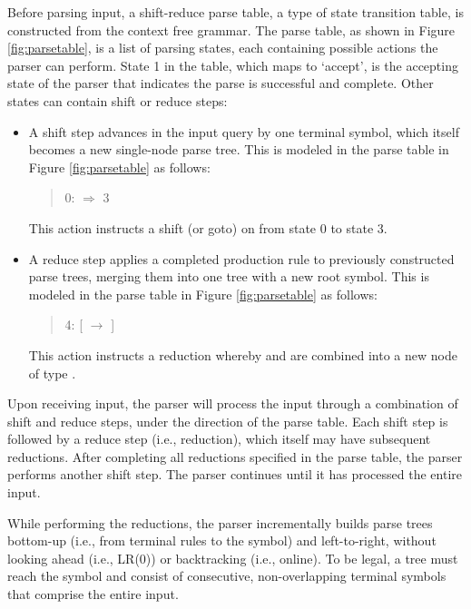 \documentclass{article}
\begin{document}
Before parsing input, a shift-reduce parse table, a type of state transition table, is constructed from the context free grammar. The parse table, as shown in Figure \ref{fig:parsetable}, is a list of parsing states, each containing possible actions the parser can perform. State 1 in the table, which maps to `accept', is the accepting state of the parser that indicates the parse is successful and complete. Other states can contain shift or reduce steps:

\begin{itemize}
\item A shift step advances in the input query by one terminal symbol, which itself becomes a new single-node parse tree. This is modeled in the parse table in Figure \ref{fig:parsetable} as follows:
\begin{quote}
0:  $\Rightarrow$ 3
\end{quote}
This action instructs a shift (or goto) on  from state 0 to state 3.

\item A reduce step applies a completed production rule to previously constructed parse trees, merging them into one tree with a new root symbol. This is modeled in the parse table in Figure \ref{fig:parsetable} as follows:
\begin{quote}
4: {[}  $\rightarrow$   ]
\end{quote}
This action instructs a reduction whereby  and  are combined into a new node of type .
\end{itemize}

Upon receiving input, the parser will process the input through a combination of shift and reduce steps, under the direction of the parse table. Each shift step is followed by a reduce step (i.e., reduction), which itself may have subsequent reductions. After completing all reductions specified in the parse table, the parser performs another shift step. The parser continues until it has processed the entire input.

While performing the reductions, the parser incrementally builds parse trees bottom-up (i.e., from terminal rules to the  symbol) and left-to-right, without looking ahead (i.e., LR(0)) or backtracking (i.e., online). To be legal, a tree must reach the  symbol and consist of consecutive, non-overlapping terminal symbols that comprise the entire input.
\end{document}

